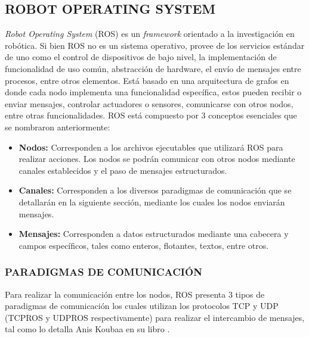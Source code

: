 \subsection{ROBOT OPERATING SYSTEM}
\textit{Robot Operating System} (ROS) es un \textit{framework} orientado a la investigación en robótica. Si bien ROS no es un sistema operativo, provee de los servicios estándar de uno como el control de dispositivos de bajo nivel, la implementación de funcionalidad de uso común, abstracción de hardware, el envío de mensajes entre procesos, entre otros elementos. Está basado en una arquitectura de grafos en donde cada nodo implementa una funcionalidad específica, estos pueden recibir o enviar mensajes, controlar actuadores o sensores, comunicarse con otros nodos, entre otras funcionalidades.
ROS está compuesto por 3 conceptos esenciales que se nombraron anteriormente:
\begin{itemize}
    \item \textbf{Nodos: } Corresponden a los archivos ejecutables que utilizará ROS para realizar acciones. Los nodos se podrán comunicar con otros nodos mediante canales establecidos y el paso de mensajes estructurados.
    \item \textbf{Canales: } Corresponden a los diversos paradigmas de comunicación que se detallarán en la siguiente sección, mediante los cuales los nodos enviarán mensajes.
    \item \textbf{Mensajes: } Corresponden a datos estructurados mediante una cabecera y campos específicos, tales como enteros, flotantes, textos, entre otros.
\end{itemize}

\subsubsection{PARADIGMAS DE COMUNICACIÓN}
Para realizar la comunicación entre los nodos, ROS presenta 3 tipos de paradigmas de comunicación los cuales utilizan los protocolos TCP y UDP (TCPROS y UDPROS respectivamente) para realizar el intercambio de mensajes, tal como lo detalla Anis Koubaa en su libro \cite{anis_koubaa_robot_2016}.

